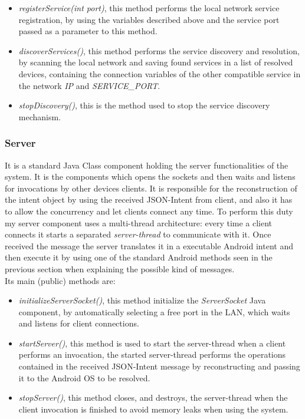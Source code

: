 \begin{itemize}
	\item \textit{registerService(int port)}, this method performs the local network service registration, by using the variables described above and the service port passed as a parameter to this method.
	\item \textit{discoverServices()}, this method performs the service discovery and resolution, by scanning the local network and saving found services in a list of resolved devices, containing the connection variables of the other compatible service in the network \textit{IP} and \textit{SERVICE\_PORT}.
	\item \textit{stopDiscovery()}, this is the method used to stop the service discovery mechanism.
\end{itemize}

\subsubsection{Server}
It is a standard Java Class component holding the server functionalities of the system. It is the components which opens the sockets and then waits and listens for invocations by other devices clients. It is responsible for the reconstruction of the intent object by using the received JSON-Intent from client, and also it has to allow the concurrency and let clients connect any time.
To perform this duty my server component uses a multi-thread architecture: every time a client connects it starts a separated \textit{server-thread} to communicate with it. Once received the message the server translates it in a executable Android intent and then execute it by using one of the standard Android methods seen in the previous section when explaining the possible kind of messages.\\
Its main (public) methods are:
\begin{itemize}
	\item \textit{initializeServerSocket()}, this method initialize the \textit{ServerSocket} Java component, by automatically selecting a free port in the LAN, which waits and listens for client connections.
	\item \textit{startServer()}, this method is used to start the server-thread when a client performs an invocation, the started server-thread performs the operations contained in the received JSON-Intent message by reconstructing and passing it to the Android OS to be resolved.
	\item \textit{stopServer()}, this method closes, and destroys, the server-thread when the client invocation is finished to avoid memory leaks when using the system. 
\end{itemize}

